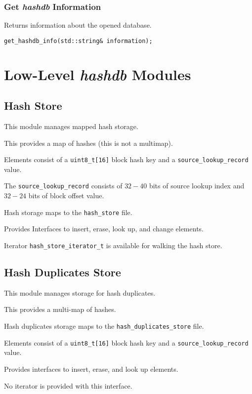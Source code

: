 \documentclass[12pt,twoside]{article}
\newcommand{\hdb}{\emph{hashdb}\xspace}
\begin{document}
\subsubsection{Get \hdb Information}
Returns information about the opened database.

\begin{small}
\begin{verbatim}
get_hashdb_info(std::string& information);
\end{verbatim}
\end{small}

\section{Low-Level \hdb Modules}

\subsection{Hash Store}
This module manages mapped hash storage.
\begin{compactitem}
\item This provides a map of hashes (this is not a multimap).
\item Elements consist of a
\texttt{uint8\_t[16]} block hash key and a
\texttt{source\_lookup\_record} value.
\item The \texttt{source\_lookup\_record} consists of $32-40$ bits
of source lookup index and $32-24$ bits of block offset value.
\item Hash storage maps to the \texttt{hash\_store} file.
\item Provides Interfaces to insert, erase, look up, and change elements.
\item Iterator \texttt{hash\_store\_iterator\_t} is available
for walking the hash store.
\end{compactitem}

\subsection{Hash Duplicates Store}
This module manages storage for hash duplicates.
\begin{compactitem}
\item This provides a multi-map of hashes.
\item Hash duplicates storage maps to the \texttt{hash\_duplicates\_store} file.
\item Elements consist of a
\texttt{uint8\_t[16]} block hash key and a
\texttt{source\_lookup\_record} value.
\item Provides interfaces to insert, erase, and look up elements.
\item No iterator is provided with this interface.
\end{compactitem}
\end{document}
